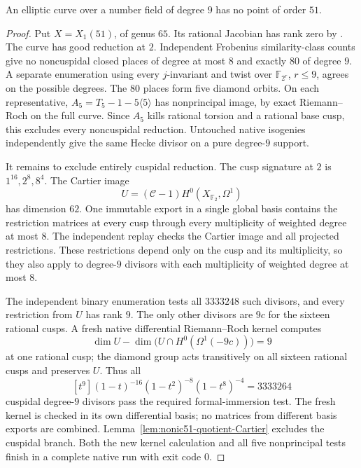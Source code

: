 
\begin{proposition}\label{prop:nonic-no51}
An elliptic curve over a number field of degree $9$ has no point of order $51$.
\end{proposition}
\begin{proof}
Put $X=X_1(51)$, of genus $65$. Its rational Jacobian has rank zero
by \cite[Theorem~3.1(2)]{DEHMZ}. The curve has good reduction at $2$.
Independent Frobenius similarity-class counts give no noncuspidal
closed places of degree at most $8$ and exactly $80$ of degree $9$.
A separate enumeration using every $j$-invariant and twist over
$\mathbb F_{2^r}$, $r\le9$, agrees on the possible degrees.
The $80$ places form five diamond orbits. On each representative,
$A_5=T_5-1-5\langle5\rangle$ has nonprincipal image, by exact
Riemann--Roch on the full curve. Since $A_5$ kills rational torsion
and a rational base cusp, this excludes every noncuspidal reduction.
Untouched native isogenies independently give the same Hecke divisor
on a pure degree-$9$ support.

It remains to exclude entirely cuspidal reduction. The cusp signature
at $2$ is $1^{16},2^8,8^4$. The Cartier image
\[
 U=(\mathcal C-1)H^0(X_{\mathbb F_2},\Omega^1)
\]
has dimension $62$. One immutable export in a single global basis
contains the restriction matrices at every cusp through every
multiplicity of weighted degree at most $8$. The independent replay
checks the Cartier image and all projected restrictions. These
restrictions depend only on the cusp and its multiplicity, so they
also apply to degree-$9$ divisors with each multiplicity of weighted
degree at most $8$.

The independent binary enumeration tests all $3333248$ such divisors,
and every restriction from $U$ has rank $9$. The only other divisors
are $9c$ for the sixteen rational cusps. A fresh native differential
Riemann--Roch kernel computes
\[
 \dim U-\dim\bigl(U\cap H^0(\Omega^1(-9c))\bigr)=9
\]
at one rational cusp; the diamond group acts transitively on all sixteen
rational cusps and preserves $U$. Thus all
\[
 [t^9](1-t)^{-16}(1-t^2)^{-8}(1-t^8)^{-4}=3333264
\]
cuspidal degree-$9$ divisors pass the required formal-immersion test.
The fresh kernel is checked in its own differential basis; no matrices
from different basis exports are combined.
Lemma~\ref{lem:nonic51-quotient-Cartier} excludes the cuspidal branch.
Both the new kernel calculation and all five nonprincipal tests finish
in a complete native run with exit code $0$.
\end{proof}
